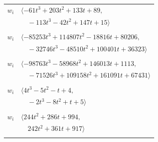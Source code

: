 \documentclass[11pt]{article}
\begin{document}
\begin{longtable}{@{}ll@{}}
$w_i$ & $\langle -61t^{3}+203t^{2}+133t+89,$\\
 & $\quad -113t^{3}-42t^{2}+147t+15\rangle$\\
\addlinespace[2pt]
\multicolumn{2}{@{}p{0.97\textwidth}@{}}{$i=68$, $D_i=1$, $\rho_{ij}$: $1{:}2, \allowbreak 5{:}1, \allowbreak 16{:}1, \allowbreak 17{:}2, \allowbreak 18{:}2, \allowbreak 26{:}2, \allowbreak 36{:}2, \allowbreak 37{:}2, \allowbreak 39{:}1, \allowbreak 55{:}1, \allowbreak 60{:}2, \allowbreak 61{:}1, \allowbreak 67{:}1, \allowbreak 69{:}1, \allowbreak 71{:}1, \allowbreak 72{:}2, \allowbreak 78{:}1, \allowbreak 82{:}2, \allowbreak 87{:}1, \allowbreak 95{:}1$}\\
$w_i$ & $\langle -85253t^{3}+114807t^{2}-18816t+80206,$\\
 & $\quad -32746t^{3}-48510t^{2}+100401t+36323\rangle$\\
\addlinespace[2pt]
\multicolumn{2}{@{}p{0.97\textwidth}@{}}{$i=69$, $D_i=1$, $\rho_{ij}$: $2{:}1, \allowbreak 5{:}2, \allowbreak 17{:}2, \allowbreak 31{:}2, \allowbreak 33{:}1, \allowbreak 34{:}1, \allowbreak 36{:}2, \allowbreak 42{:}1, \allowbreak 60{:}2, \allowbreak 68{:}2, \allowbreak 71{:}2, \allowbreak 74{:}1, \allowbreak 79{:}2, \allowbreak 87{:}1, \allowbreak 95{:}1, \allowbreak 97{:}1$}\\
$w_i$ & $\langle -98763t^{3}-58968t^{2}+146013t+1113,$\\
 & $\quad -71526t^{3}+109158t^{2}+161091t+67431\rangle$\\
\addlinespace[2pt]
\multicolumn{2}{@{}p{0.97\textwidth}@{}}{$i=70$, $D_i=1$, $\rho_{ij}$: $0{:}1, \allowbreak 34{:}1, \allowbreak 36{:}1, \allowbreak 37{:}1, \allowbreak 39{:}2, \allowbreak 41{:}2, \allowbreak 71{:}1, \allowbreak 74{:}2, \allowbreak 78{:}1$}\\
$w_i$ & $\langle 4t^{3}-5t^{2}-t+4,$\\
 & $\quad -2t^{3}-8t^{2}+t+5\rangle$\\
\addlinespace[2pt]
\multicolumn{2}{@{}p{0.97\textwidth}@{}}{$i=71$, $D_i=1$, $\rho_{ij}$: $17{:}2, \allowbreak 33{:}2, \allowbreak 39{:}1, \allowbreak 52{:}1, \allowbreak 55{:}2, \allowbreak 56{:}1, \allowbreak 61{:}2, \allowbreak 63{:}1, \allowbreak 67{:}1, \allowbreak 68{:}2, \allowbreak 69{:}1, \allowbreak 70{:}2, \allowbreak 76{:}2, \allowbreak 89{:}1, \allowbreak 95{:}1, \allowbreak 97{:}2$}\\
$w_i$ & $\langle 244t^{2}+286t+994,$\\
 & $\quad 242t^{2}+361t+917\rangle$\\
\addlinespace[2pt]

\end{longtable}
\end{document}
